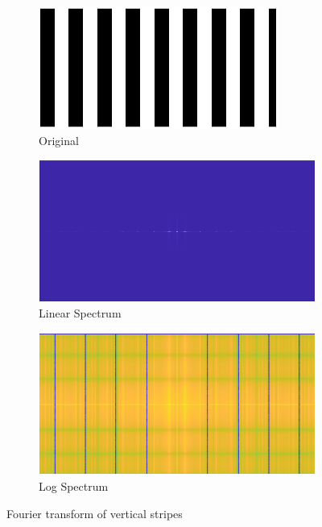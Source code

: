 \begin{figure}[!ht]
    \centering
    \begin{subfigure}{0.32\textwidth}
        \centering
        \includegraphics[width=\textwidth]{Doc/Graphics/Part1/Q3_vstripes.png}
        \caption{Original}
    \end{subfigure}
    \hfill
    \begin{subfigure}{0.32\textwidth}
        \centering
        \includegraphics[width=\textwidth]{Doc/Graphics/Part1/Q13_Vertical stripes.png}
        \caption{Linear Spectrum}
    \end{subfigure}
    \hfill
    \begin{subfigure}{0.32\textwidth}
        \centering
        \includegraphics[width=\textwidth]{Doc/Graphics/Part1/Q13_log_Vertical stripes.png}
        \caption{Log Spectrum}
    \end{subfigure}
    \caption{Fourier transform of vertical stripes}
\end{figure}
\FloatBarrier

